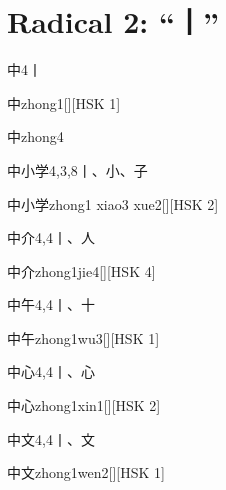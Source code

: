 
\section*{Radical 2: ``⼁''}

\begin{entry}{中}{4}{⼁}
  \begin{phonetics}{中}{zhong1}[][HSK 1]
  \end{phonetics}
  \begin{phonetics}{中}{zhong4}
  \end{phonetics}
\end{entry}

\begin{entry}{中小学}{4,3,8}{⼁、⼩、⼦}
  \begin{phonetics}{中小学}{zhong1 xiao3 xue2}[][HSK 2]
  \end{phonetics}
\end{entry}

\begin{entry}{中介}{4,4}{⼁、⼈}
  \begin{phonetics}{中介}{zhong1jie4}[][HSK 4]
  \end{phonetics}
\end{entry}

\begin{entry}{中午}{4,4}{⼁、⼗}
  \begin{phonetics}{中午}{zhong1wu3}[][HSK 1]
  \end{phonetics}
\end{entry}

\begin{entry}{中心}{4,4}{⼁、⼼}
  \begin{phonetics}{中心}{zhong1xin1}[][HSK 2]
  \end{phonetics}
\end{entry}

\begin{entry}{中文}{4,4}{⼁、⽂}
  \begin{phonetics}{中文}{zhong1wen2}[][HSK 1]
  \end{phonetics}
\end{entry}

